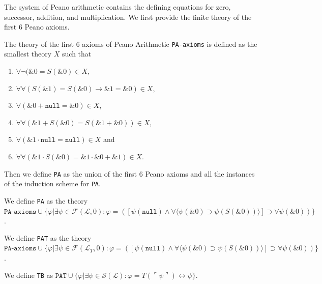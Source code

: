 The system of Peano arithmetic contains the defining equations for zero, successor, addition, and multiplication. We first provide the finite theory of the first 6 Peano axioms.
\begin{definition}\label{def:PA-Axioms}
  \leanok
    The theory of the first 6 axioms of Peano Arithmetic \texttt{PA-axioms} is defined as the smallest theory $X$ such that
    \begin{enumerate}
        \item $\forall \neg (\&0 = S(\&0) \in X$, 
        \item $\forall \forall (S(\&1) = S(\&0) \rightarrow \&1 = \&0) \in X$,
        \item $\forall (\&0 + \texttt{null} = \&0) \in X$,
        \item $\forall \forall (\&1 + S(\&0) = S(\&1 + \&0)) \in X$,
        \item $\forall (\&1 \cdot \texttt{null} = \texttt{null}) \in X$ and
        \item $\forall  \forall (\&1 \cdot S(\&0) = \&1 \cdot \&0 + \&1) \in X$.
    \end{enumerate}
\end{definition}

Then we define \texttt{PA} as the union of the first 6 Peano axioms and all the instances of the induction scheme for \texttt{PA}.
\begin{definition}\label{def:PA}
  \leanok
  We define \texttt{PA} as the theory $\texttt{PA-axioms} \cup \{φ | ∃ψ \in \mathcal{F}(\mathcal{L},{0}) : φ = ([ψ(\texttt{null}) \wedge ∀\langle ψ(\&0) \supset ψ(S(\&0)) \rangle ] \supset ∀ψ(\&0))\}$.
\end{definition}

\begin{definition}\label{def:PAT}
  \leanok
    We define \texttt{PAT} as the theory $\texttt{PA-axioms} \cup \{φ | ∃ψ \in \mathcal{F}(\mathcal{L}_T,{0}) : φ = ([ψ(\texttt{null}) \wedge ∀\langle ψ(\&0) \supset ψ(S(\&0)) \rangle ] \supset ∀ψ(\&0))\}$.
\end{definition}

\begin{definition}[\texttt{TB}]\label{def:TB}
  \leanok
    We define \texttt{TB} as $\texttt{PAT} \cup \{φ | ∃ψ \in \mathcal{S}(\mathcal{L}) : φ = T(⌜ψ⌝) \leftrightarrow ψ\}$.
\end{definition}


